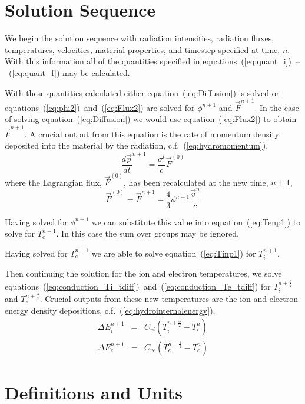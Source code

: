 \documentclass{article}
\begin{document}
\section{Solution Sequence}

We begin the solution sequence with radiation intensities,
radiation fluxes, temperatures, velocities,
material properties, and timestep specified at time, $n$.
With this information all of the quantities specified in
equations~(\ref{eq:quant_i})~--~(\ref{eq:quant_f}) may be calculated.

With these quantities calculated either equation~(\ref{eq:Diffusion}) is
solved or equations~(\ref{eq:phi2})~and~(\ref{eq:Flux2}) are solved for
$\phi^{n+1}$ and $\vec{F}^{n+1}$.
In the case of solving equation~(\ref{eq:Diffusion}) we would use
equation~(\ref{eq:Flux2}) to obtain $\vec{F}^{n+1}$.
A crucial output from this equation is the rate of momentum density
deposited into the material by the radiation,
c.f.~(\ref{eq:hydromomentum}),
\begin{equation}
   {\frac{d\vec{p}}{dt}}^{n+1} = \frac{\sigma^{t}}{c} \vec{F}^{(0)}
\end{equation}
where the Lagrangian flux, $\vec{F}^{(0)}$, has been recalculated at the
new time, $n+1$,
\begin{equation}
   \vec{F}^{(0)} = \vec{F}^{n+1} - \frac{4}{3} \phi^{n+1}
						\frac{\vec{v}^{n}}{c}
\end{equation}

Having solved for $\phi^{n+1}$ we can substitute this
value into equation~(\ref{eq:Tenp1}) to solve for $T_{e}^{n+1}$.
In this case the sum over groups may be ignored.

Having solved
for $T_{e}^{n+1}$ we are able to
solve equation~(\ref{eq:Tinp1}) for $T_{i}^{n+1}$.

Then continuing the solution for the ion and electron temperatures, we solve
equations~(\ref{eq:conduction_Ti_tdiff})~and~(\ref{eq:conduction_Te_tdiff})
for $T_{i}^{n+\frac{3}{2}}$ and $T_{e}^{n+\frac{3}{2}}$.
Crucial outputs from these new temperatures are the ion and electron
energy density depositions,
c.f.~(\ref{eq:hydrointernalenergy}),
\begin{eqnarray}
	\Delta E_{i}^{n+1} &=& C_{vi} ( T_{i}^{n+\frac{3}{2}} - T_{i}^{n})
  \\
	\Delta E_{e}^{n+1} &=& C_{ve} ( T_{e}^{n+\frac{3}{2}} - T_{e}^{n})
\end{eqnarray}

\appendix

\section{Definitions and Units}
\end{document}

